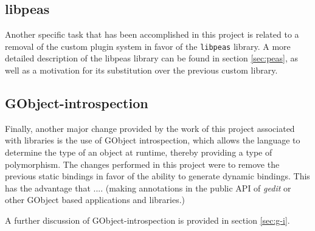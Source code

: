 \subsection{libpeas}\label{sec:libpeas}

Another specific task that has been accomplished in this project is related to a removal of the 
custom plugin system in favor of the \texttt{libpeas} library.  A more detailed description of the 
libpeas library can be found in section \ref{sec:peas}, as well as a motivation for its substitution
over the previous custom library. 

\subsection{GObject-introspection}\label{sec:GObjectIntrospection}


Finally, another major change provided by the work of this project associated with libraries 
is the use of GObject introspection, which allows the language to determine the type of an 
object at runtime, thereby providing a type of polymorphism.  The changes performed in this 
project were to remove the previous static bindings in favor of the ability to 
generate dynamic bindings.   This has the advantage that ....
(making annotations 
in the public API of \emph{gedit} or other 
GObject based applications and libraries.)

A further discussion of GObject-introspection is provided in section \ref{sec:g-i}.

